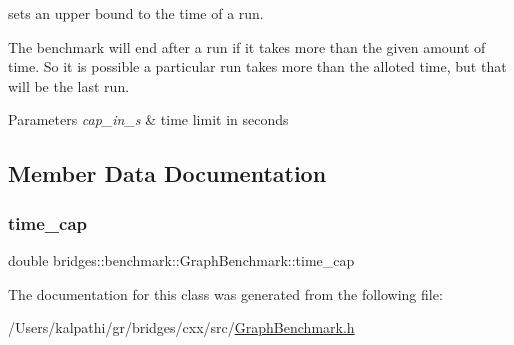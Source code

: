 sets an upper bound to the time of a run. 

The benchmark will end after a run if it takes more than the given amount of time. So it is possible a particular run takes more than the alloted time, but that will be the last run.


\begin{DoxyParams}{Parameters}
{\em cap\+\_\+in\+\_\+s} & time limit in seconds \\
\hline
\end{DoxyParams}


\subsection{Member Data Documentation}
\mbox{\label{classbridges_1_1benchmark_1_1_graph_benchmark_a59938016b721fb6db2ff8bdb2c9d41c1}} 
\subsubsection{\texorpdfstring{time\_cap}{time\_cap}}
{\footnotesize\ttfamily double bridges\+::benchmark\+::\+Graph\+Benchmark\+::time\+\_\+cap\hspace{0.3cm}{\ttfamily [protected]}}



The documentation for this class was generated from the following file\+:\begin{DoxyCompactItemize}
\item 
/\+Users/kalpathi/gr/bridges/cxx/src/\mbox{\hyperlink{_graph_benchmark_8h}{Graph\+Benchmark.\+h}}\end{DoxyCompactItemize}
